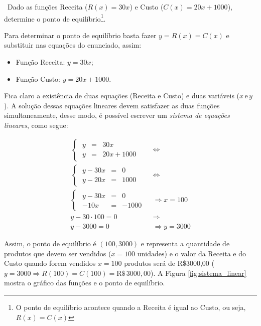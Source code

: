 \begin{example}
	\video \, Dado as funções Receita ($R(x)=30x$) e Custo ($C(x)=20x+1000$),
	determine o ponto de equilíbrio\footnote{O ponto de equilíbrio acontece quando a Receita é igual ao Custo,
		ou seja, $R(x)=C(x)$}.

	Para determinar o ponto de equilíbrio basta fazer $y=R(x)=C(x)$ e substituir nas equações do enunciado, assim:
\begin{itemize}
	\item Função Receita: $y=30x$;
	\item Função Custo: $y=20x+1000$.
\end{itemize}
Fica claro a existência de duas equações (Receita e Custo) e duas variáveis ($x\,\mathrm{e}\,y$). A solução dessas equações lineares devem satisfazer as duas funções simultaneamente, desse modo, é possível escrever um \textit{sistema de equações lineares}, como segue:

\begin{ceqn}
	\begin{align*}
	\left\{ \begin{alignedat}{1}\begin{array}{ccc}
	y & = & 30x\\
	y & = & 20x+1000
	\end{array}\end{alignedat}
	\right. & \Leftrightarrow\\
	\left\{ \begin{alignedat}{1}\begin{array}{ccc}
	y-30x & = & 0\\
	y-20x & = & 1000
	\end{array}\end{alignedat}
	\right. & \Leftrightarrow\\
	\left\{ \begin{alignedat}{1}\begin{array}{ccc}
	y-30x & = & 0\\
	-10x & = & -1000
	\end{array}\end{alignedat}
	\right. & \Rightarrow  x=100\\
	y-30\cdot100=0 & \Rightarrow\\
	y-3000=0 & \Rightarrow  y=3000
	\end{align*}
\end{ceqn}


Assim, o ponto de equilíbrio é $(100,3000)$ e representa a quantidade de produtos que devem ser vendidos ($x=100\,\,\mathrm{unidades}$)
e o valor da Receita e do Custo quando forem vendidos $x=100$ produtos será de R\$3000,00 ($y=3000\Rightarrow R(100)=C(100)=\mathrm{R}\$ \,3000,00$).
A Figura \ref{fig:sistema_linear} mostra o gráfico das funções e o ponto de equilíbrio.


\end{example}
